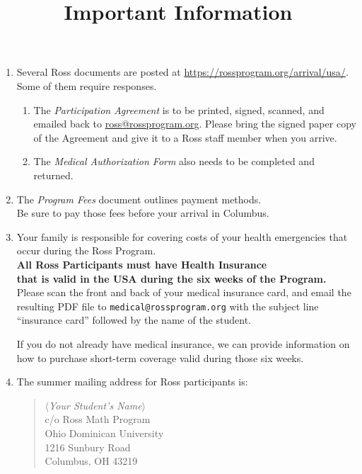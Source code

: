 \documentclass[11pt]{ross}
\title{Important Information}
\newcommand{\spa}{\hspace*{1cm}}
\newcommand{\spz}{\hspace*{5mm}}
\begin{document}
\maketitle
 \begin{enumerate}[label=(\arabic*),itemsep=2em,topsep=-1em]
\item Several Ross documents are posted at \url{https://rossprogram.org/arrival/usa/}.  \\
Some of them require responses.  
 \begin{enumerate}[label=(\alph*),itemsep=0.5em,topsep=0em]
\item The {\it Participation Agreement} is to be printed, signed, scanned, and emailed back to 
\href{mailto:ross@rossprogram.org}{ross@rossprogram.org}.  Please bring the signed paper copy of the Agreement and give it to a Ross staff member when you arrive. 
\item The {\it Medical Authorization Form} also needs to be completed and returned.
\end{enumerate}

\item The \textit{Program Fees} document outlines payment methods.  \\
\spa Be sure to pay those fees before your arrival in Columbus.

\item Your family is responsible for covering costs of your health
emergencies that occur during the Ross Program.\\
\spz  \textbf{All Ross Participants must have Health Insurance \\
\spz that is valid in the USA during the six weeks of the Program.} \\[5pt]
   Please scan the front and back of your medical insurance card, and email the resulting PDF file to
\texttt{medical@rossprogram.org} with the subject line ``insurance card''
followed by the name of the student. 

If you do not already have medical insurance, we can provide information on how to purchase short-term coverage valid during those six weeks.

\item The summer mailing address for Ross participants is:
\begin{quote}
\textit{$\langle$Your Student's Name$\rangle$} \\
c/o Ross Math Program\\
Ohio Dominican University \\
1216 Sunbury Road \\
Columbus, OH 43219
\end{quote}


\end{enumerate}
\end{document}
